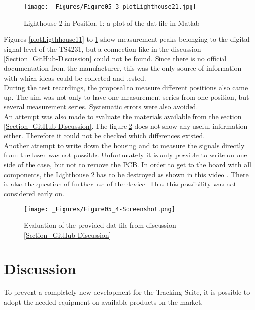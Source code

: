 \documentclass[a4paper,twoside, openright,12pt]{report}
\begin{document}
\begin{figure}[h]
\begin{center}
\texttt{[image: \_Figures/Figure05\_3-plotLighthouse21.jpg]}
\caption{Lighthouse 2 in Position 1: a plot of the dat-file in Matlab}
\label{Lighthouse21}
\end{center}
\end{figure}
Figures \ref{plotLigthhouse11} to \ref{Lighthouse21} show measurement peaks belonging to the digital signal level of the TS4231, but a connection like in the discussion \ref{Section_GitHub-Discussion} could not be found. Since there is no official documentation from the manufacturer, this was the only source of information with which ideas could be collected and tested.\\
During the test recordings, the proposal to measure different positions also came up. The aim was not only to have one measurement series from one position, but several measurement series. Systematic errors were also avoided. \\
An attempt was also made to evaluate the materials available from the section \ref{Section_GitHub-Discussion}. The figure \ref{Screenshot} does not show any useful information either. Therefore it could not be checked which differences existed. \\
Another attempt to write down the housing and to measure the signals directly from the laser was not possible. Unfortunately it is only possible to write on one side of the case, but not to remove the PCB. In order to get to the board with all components, the Lighthouse 2 has to be destroyed as shown in this video \cite{.d}. There is also the question of further use of the device. Thus this possibility was not considered early on.
\begin{figure}[h]
\begin{center}
\texttt{[image: \_Figures/Figure05\_4-Screenshot.png]}
\caption{Evaluation of the provided dat-file from discussion \ref{Section_GitHub-Discussion}}
\label{Screenshot}
\end{center}
\end{figure}


\chapter{Discussion}
\label{Chapter_Discussion}
To prevent a completely new development for the Tracking Suite, it is possible to adopt the needed equipment on available products on the market.
\end{document}
